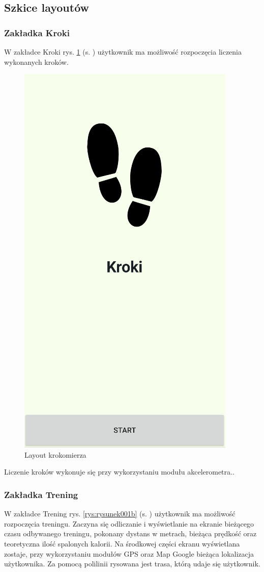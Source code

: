 \subsection{Szkice layoutów}		%

\subsubsection{Zakładka Kroki} %

\hspace{0.60cm}W zakładce Kroki rys. \ref{rys:rysunek001a} (s. \pageref{rys:rysunek001a}) użytkownik ma możliwość rozpoczęcia liczenia wykonanych kroków.

\begin{figure}[!htb]
	\centering
	\includegraphics[width=.2\linewidth]{rys/kroki.png}
	\caption{Layout krokomierza}
	\label{rys:rysunek001a}
\end{figure}

Liczenie kroków wykonuje się przy wykorzystaniu modułu akcelerometra..

\subsubsection{Zakładka Trening} %

\hspace{0.60cm}W zakładce Trening rys. \ref{rys:rysunek001b} (s. \pageref{rys:rysunek001b}) użytkownik ma możliwość rozpoczęcia treningu. Zaczyna się odliczanie i wyświetlanie na ekranie bieżącego czasu odbywanego treningu, pokonany dystans w metrach, bieżąca prędkość oraz teoretyczna ilość spalonych kalorii. Na środkowej części ekranu wyświetlana zostaje, przy wykorzystaniu modułów GPS oraz  Map Google bieżąca lokalizacja użytkownika. Za pomocą polilinii rysowana jest trasa, którą udaje się użytkownik. 

